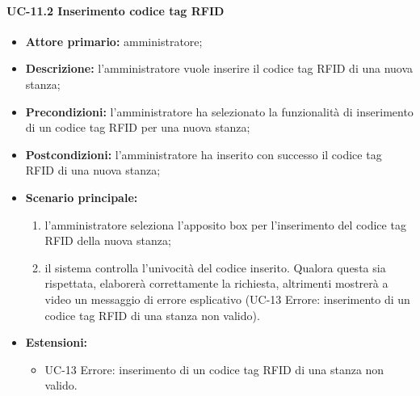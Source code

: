 \paragraph{UC-11.2 Inserimento codice tag RFID}
   \begin{itemize}
	\item \textbf{Attore primario:} amministratore;
	\item \textbf{Descrizione:} l'amministratore vuole inserire il codice tag RFID di una nuova stanza;
	\item \textbf{Precondizioni:} l'amministratore ha selezionato la funzionalità di inserimento di un codice tag RFID per una nuova stanza;
	\item \textbf{Postcondizioni:} l'amministratore ha inserito con successo il codice tag RFID di una nuova stanza;
	\item \textbf{Scenario principale:}
	      \begin{enumerate}
		      \item l'amministratore seleziona l'apposito box per l'inserimento del codice tag RFID della nuova stanza;
		      \item il sistema controlla l'univocità del codice inserito. Qualora questa sia rispettata, elaborerà correttamente la richiesta, altrimenti mostrerà a video un messaggio di errore esplicativo (UC-13 Errore: inserimento di un codice tag RFID di una stanza non valido).
	      \end{enumerate}
	\item \textbf{Estensioni:}
		\begin{itemize}
		      \item UC-13 Errore: inserimento di un codice tag RFID di una stanza non valido.
	      \end{itemize}
\end{itemize}


